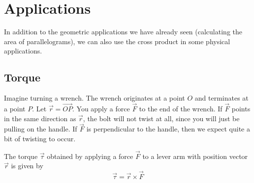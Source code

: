 \documentclass{ximera}
\begin{document}
\section{Applications}

In addition to the geometric applications we have already seen
(calculating the area of parallelograms), we can also use the cross
product in some physical applications.

\subsection{Torque}

Imagine turning a wrench.  The wrench originates at a point $O$ and
terminates at a point $P$.  Let $\vec{r} = \overrightarrow{OP}$.  You
apply a force $\vec{F}$ to the end of the wrench.  If $\vec{F}$ points
in the same direction as $\vec{r}$, the bolt will not twist at all,
since you will just be pulling on the handle.  If $\vec{F}$ is
perpendicular to the handle, then we expect quite a bit of twisting to
occur.

\begin{definition}
  The torque $\vec{\tau}$ obtained by applying a force $\vec{F}$ to a lever arm with position vector $\vec{r}$ is given by
  \[
  \vec{\tau} = \vec{r} \times \vec{F} 
  \]
\end{definition}
\end{document}
